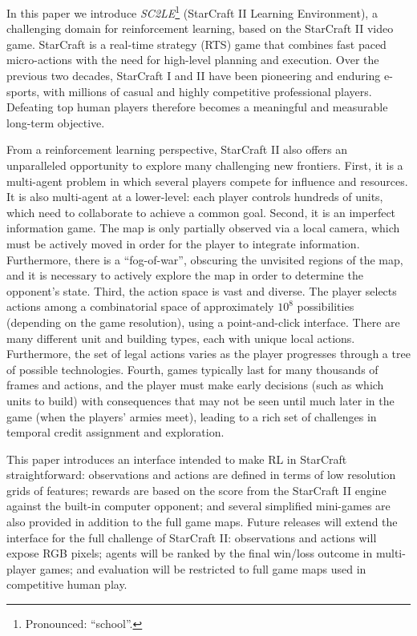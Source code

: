 In this paper we introduce \emph{SC2LE}\footnote{Pronounced: ``school''.} (StarCraft II Learning Environment), a challenging domain for reinforcement learning, based on the StarCraft II video game. StarCraft is a real-time strategy (RTS) game that combines fast paced micro-actions with the need for high-level planning and execution. Over the previous two decades, StarCraft I and II have been pioneering and enduring e-sports, with millions of casual and highly competitive professional players. Defeating top human players therefore becomes a meaningful and measurable long-term objective. 

From a reinforcement learning perspective, StarCraft II also offers an unparalleled opportunity to explore many challenging new frontiers. First, it is a multi-agent problem in which several players compete for influence and resources. It is also multi-agent at a lower-level: each player controls hundreds of units, which need to collaborate to achieve a common goal. Second, it is an imperfect information game. The map is only partially observed via a local camera, which must be actively moved in order for the player to integrate information. Furthermore, there is a ``fog-of-war'', obscuring the unvisited regions of the map, and it is necessary to actively explore the map in order to determine the opponent's state. Third, the action space is vast and diverse. The player selects actions among a combinatorial space of approximately $10^8$ possibilities (depending on the game resolution), using a point-and-click interface. There are many different unit and building types, each with unique local actions. Furthermore, the set of legal actions varies as the player progresses through a tree of possible technologies. Fourth, games typically last for many thousands of frames and actions, and the player must make early decisions (such as which units to build) with consequences that may not be seen until much later in the game (when the players' armies meet), leading to a rich set of challenges in temporal credit assignment and exploration.

This paper introduces an interface intended to make RL in StarCraft straightforward: observations and actions are defined in terms of low resolution grids of features; rewards are based on the score from the StarCraft II engine against the built-in computer opponent; and several simplified mini-games are also provided in addition to the full game maps. Future releases will extend the interface for the full challenge of StarCraft II: observations and actions will expose RGB pixels; agents will be ranked by the final win/loss outcome in multi-player games; and evaluation will be restricted to full game maps used in competitive human play.

